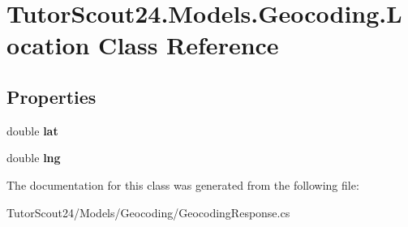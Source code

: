 \hypertarget{class_tutor_scout24_1_1_models_1_1_geocoding_1_1_location}{}\section{Tutor\+Scout24.\+Models.\+Geocoding.\+Location Class Reference}
\label{class_tutor_scout24_1_1_models_1_1_geocoding_1_1_location}
\subsection*{Properties}
\begin{DoxyCompactItemize}
\item 
\mbox{\label{class_tutor_scout24_1_1_models_1_1_geocoding_1_1_location_ae38360392c265a0bdc86b9235c9cfcfb}} 
double {\bfseries lat}
\item 
\mbox{\label{class_tutor_scout24_1_1_models_1_1_geocoding_1_1_location_a28c4858f33487a0dd204b6afb559156e}} 
double {\bfseries lng}
\end{DoxyCompactItemize}


The documentation for this class was generated from the following file\+:\begin{DoxyCompactItemize}
\item 
Tutor\+Scout24/\+Models/\+Geocoding/Geocoding\+Response.\+cs\end{DoxyCompactItemize}
